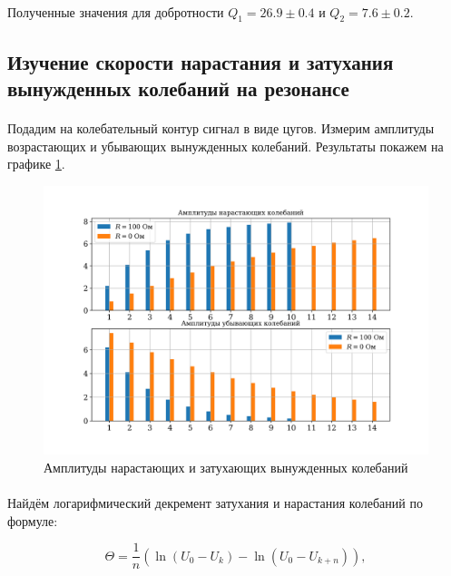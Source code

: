 \documentclass[a4paper,12pt]{article} %
\begin{document}
\paragraph{} Полученные значения для добротности $Q_1 = 26.9\pm0.4$ и  $Q_2 = 7.6\pm0.2$.

\subsection{Изучение скорости нарастания и затухания вынужденных колебаний на резонансе}

\paragraph{} Подадим на колебательный контур сигнал в виде цугов. Измерим амплитуды возрастающих и убывающих вынужденных колебаний. Результаты покажем на графике \ref{graph:2}.

\begin{figure} [h]
\begin{center}
\includegraphics[width=\textwidth]{plot2.png}
\caption{Амплитуды нарастающих и затухающих вынужденных колебаний}
\label{graph:2}
\end{center}
\end{figure}

\paragraph{} Найдём логарифмический декремент затухания и нарастания колебаний по формуле:

\[ \Theta = \frac{1}{n} \left( \ln{(U_0 - U_k)} - \ln{(U_0 - U_{k+n})} \right), 
\]
\end{document}
